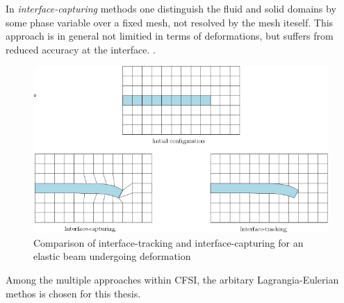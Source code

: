 In \textit{interface-capturing} methods one distinguish the fluid and solid domains by some phase variable over a fixed mesh, not resolved by the mesh iteself. This approach is in general not limitied in terms of deformations, but suffers from reduced accuracy at the interface. \cite{Frei2016}. 

\begin{figure}[h!]
  \centering
    \includegraphics[scale=0.5]{./Fig/interface.png}
      \caption{Comparison of interface-tracking and interface-capturing for an elastic beam undergoing deformation}
\end{figure}

Among the multiple approaches within CFSI, the arbitary Lagrangia-Eulerian methos is chosen for this thesis. 






